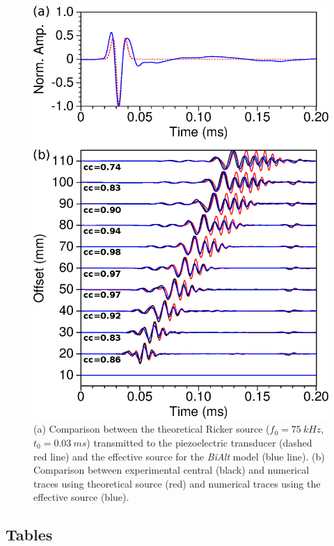 \documentclass[paper,extra]{gji} %
\newcommand{\bialt}{\textit{BiAlt} }
\begin{document}


\begin{figure}[!h]
\centering
\includegraphics[width=0.75\columnwidth]{fig/panel_bialt_lswe.eps}
\caption{(a) Comparison between the theoretical Ricker source ($f_{0}=75\ kHz$, $t_{0}=0.03\ ms$) transmitted to the piezoelectric transducer (dashed red line) and the effective source for the \bialt model (blue line). (b) Comparison between experimental central (black) and numerical traces using theoretical source (red) and numerical traces using the effective source (blue). }
\label{blind-test}
\end{figure}

\clearpage
\newpage

\subsection*{Tables}
\end{document}
